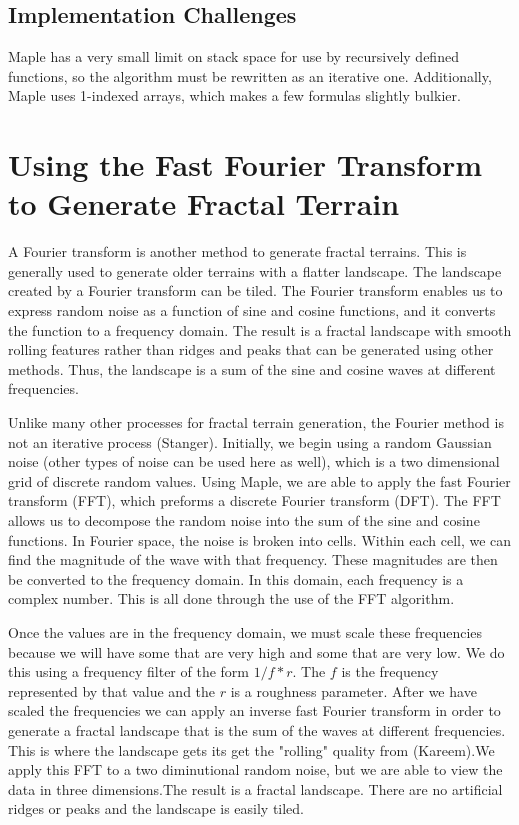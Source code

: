\documentclass{article}
\begin{document}
	\subsection{Implementation Challenges}
		Maple has a very small limit on stack space for use by recursively defined functions, so the algorithm must be rewritten as an iterative one.
		Additionally, Maple uses 1-indexed arrays, which makes a few formulas slightly bulkier.

	\section{Using the Fast Fourier Transform to Generate Fractal Terrain} 
	\label{sec:FFT}
	A Fourier transform is another method to generate fractal terrains. This is generally used to generate older terrains with a flatter landscape. The landscape created by a Fourier transform can be tiled. The Fourier transform enables us to express random noise as a function of sine and cosine functions, and it converts the function to a frequency domain. The result is a fractal landscape with smooth rolling features rather than ridges and peaks that can be generated using other methods. Thus, the landscape is a sum of the sine and cosine waves at different frequencies.
	
	Unlike many other processes for fractal terrain generation, the Fourier method is not an iterative process (Stanger). Initially, we begin using a random Gaussian noise (other types of noise can be used here as well), which is a two dimensional grid of discrete random values. Using Maple, we are able to apply the fast Fourier transform (FFT), which preforms a discrete Fourier transform (DFT). The FFT allows us to decompose the random noise into the sum of the sine and cosine functions. In Fourier space, the noise is broken into cells. Within each cell, we can find the magnitude of the wave with that frequency. These magnitudes are then be converted to the frequency domain. In this domain, each frequency is a complex number. This is all done through the use of the FFT algorithm.
	
	Once the values are in the frequency domain, we must scale these frequencies because we will have some that are very high and some that are very low. We do this using a frequency filter of the form $1/f*r$. The $f$ is the frequency represented by that value and the $r$ is a roughness parameter. After we have scaled the frequencies we can apply an inverse fast Fourier transform in order to generate a fractal landscape that is the sum of the waves at different frequencies. This is where the landscape gets its get the "rolling" quality from (Kareem).We apply this FFT to a two diminutional random noise, but we are able to view the data in three dimensions.The result is a fractal landscape. There are no artificial ridges or peaks and the landscape is easily tiled.
	
\end{document}
